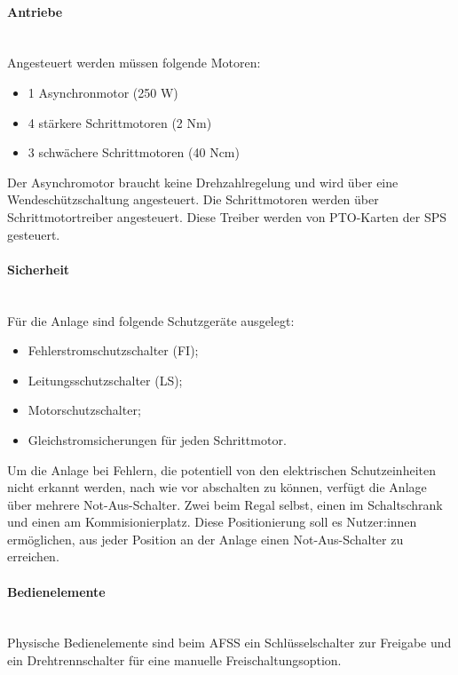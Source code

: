     \paragraph{Antriebe}\mbox{}\\
    Angesteuert werden müssen folgende Motoren:
    \begin{itemize}
        \item 1 Asynchronmotor (250 W)
        \item 4 stärkere Schrittmotoren (2 Nm)
        \item 3 schwächere Schrittmotoren (40 Ncm)
    \end{itemize}
    Der Asynchromotor braucht keine Drehzahlregelung und wird über eine Wendeschützschaltung angesteuert. Die Schrittmotoren werden über Schrittmotortreiber angesteuert. Diese Treiber werden von PTO-Karten der SPS gesteuert.

    \paragraph{Sicherheit}\mbox{}\\
    Für die Anlage sind folgende Schutzgeräte ausgelegt:
    \begin{itemize}
        \item Fehlerstromschutzschalter (FI);
        \item Leitungsschutzschalter (LS);
        \item Motorschutzschalter;
        \item Gleichstromsicherungen für jeden Schrittmotor.
    \end{itemize} 
    Um die Anlage bei Fehlern, die potentiell von den elektrischen Schutzeinheiten nicht erkannt werden, nach wie vor abschalten zu können, verfügt die Anlage über mehrere Not-Aus-Schalter. Zwei beim Regal selbst, einen im Schaltschrank und einen am Kommisionierplatz. Diese Positionierung soll es Nutzer:innen ermöglichen, aus jeder Position an der Anlage einen Not-Aus-Schalter zu erreichen.

    \paragraph{Bedienelemente}\mbox{}\\
    Physische Bedienelemente sind beim AFSS ein Schlüsselschalter zur Freigabe und ein Drehtrennschalter für eine manuelle Freischaltungsoption.

